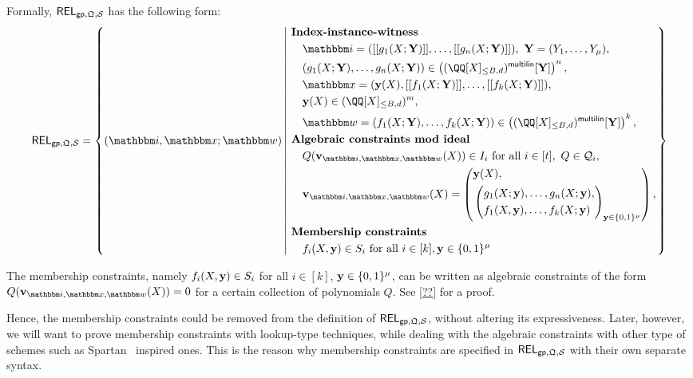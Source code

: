 \documentclass[11pt,letterpaper,usenames,dvipsnames]{article}
\begin{document}
%
    Formally, $\mathsf{REL}_{\mathsf{gp},\mathfrak{Q}, \mathcal{S}}$ has the following form:
    \begin{equation*}
    \begin{aligned}
    \REL_{\gparams,\megaQ,\cS} = \left\{ (\idx, \inp ; \wit) \left| \ \begin{aligned}
    &\textbf{Index-instance-witness}\\
    &\quad \idx = ( \oracle{g_1(X;\YY)},\ldots, \oracle{g_n(X;\YY)}), \ \YY=(Y_1,\ldots, Y_\mu), \\
            &\quad(g_1(X;\YY),\dots,g_n(X;\YY))\in \left(\mainQpolyringmultilin[\YY]\right)^{n},\\
    &\quad \inp =(\yy(X), \oracle{f_1(X;\YY)}, \ldots, \oracle{f_k(X;\YY)}),\\ &\quad \yy(X)\in \mainQpolyring^{m},\\    
        &\quad \wit = (f_1(X;\YY), \ldots, f_k(X;\YY)) \in \left(\mainQpolyringmultilin[\YY]\right)^{k},\\
        &\textbf{Algebraic constraints mod ideal}\\
        &\quad Q(\vv_{\idx, \inp,\wit}(X)) \in I_i  \text{ for all } i\in [t], \ Q\in \cQ_i,\\
        &\quad \vv_{\idx, \inp,\wit}(X) = \left(\begin{aligned}&\yy(X),\\ &\left(\begin{aligned}&g_1(X;\yy),\ldots, g_n(X;\yy),\\ &f_1(X,\yy),\ldots, f_k(X;\yy)\end{aligned}\right)_{\yy\in \BB^\mu}\\
     \end{aligned}\right),\\
     &\textbf{Membership constraints}\\
        &\quad f_i(X,\yy)\in S_i \text{ for all } i\in [k], \yy\in \{0,1\}^\mu
    \end{aligned} \right.\right\}
    \end{aligned}
    \end{equation*}

    \begin{remark}
    The membership constraints, namely $f_i(X,\mathbf{y}) \in S_i$ for all $i\in [k]$, $\mathbf{y}\in \{0,1\}^\mu$, can be written as algebraic constraints of the form $Q(\vv_{\idx,\inp,\wit}(X))=0$ for a certain collection of polynomials $Q$. See \cref{??} for a proof. 
    
    Hence, the membership constraints could be removed from the definition of $\mathsf{REL}_{\mathsf{gp}, \mathfrak{Q}, \mathcal{S}}$,  without altering its expressiveness. Later, however, we will want to prove membership constraints with lookup-type techniques, while dealing with the algebraic constraints with other type of schemes such as Spartan~\cite{C:Setty20} inspired ones. This is the reason why membership constraints are specified in $\mathsf{REL}_{\mathsf{gp},\mathfrak{Q}, \mathcal{S}}$ with their own separate syntax.
    \end{remark}
\end{document}
